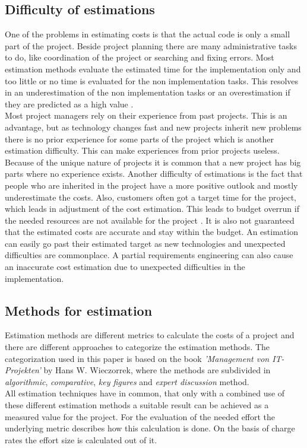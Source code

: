 \subsection{Difficulty of estimations}

One of the problems in estimating costs is that the actual code is only a small part of the project. Beside project planning there are many administrative tasks to do, like coordination of the project or searching and fixing errors. Most estimation methods evaluate the estimated time for the implementation only and too little or no time is evaluated for the non implementation tasks. This resolves in an underestimation of the non implementation tasks or an overestimation if they are predicted as a high value \cite{itplanung}.
\\
Most project managers rely on their experience from past projects. This is an advantage, but as technology changes fast and new projects inherit new problems there is no prior experience for some parts of the project which is another estimation difficulty. This can make experiences from prior projects useless. Because of the unique nature of projects it is common that a new project has big parts where no experience exists. Another difficulty of estimations is the fact that people who are inherited in the project have a more positive outlook and mostly underestimate the costs.
Also, customers often got a target time for the project, which leads in adjustment of the cost estimation. This leads to budget overrun if the needed resources are not available for the project \cite{winfwiki}. It is also not guaranteed that the estimated costs are accurate and stay within the budget. An estimation can easily go past their estimated target as new technologies and unexpected difficulties are commonplace. A partial requirements engineering can also cause an inaccurate cost estimation due to unexpected difficulties in the implementation.\\

\subsection{Methods for estimation}\label{chapter:estimationmethods}

Estimation methods are different metrics to calculate the costs of a project and there are different approaches to categorize the estimation methods. The categorization used in this paper is based on the book \textit{'Management von IT-Projekten'} by Hans W. Wieczorrek, where the methods are subdivided in \textit{algorithmic}, \textit{comparative}, \textit{key figures} and \textit{expert discussion} method\cite{itplanung}.\\
All estimation techniques have in common, that only with a combined use of these different estimation methods a suitable result can be achieved as a measured value for the project. For the evaluation of the needed effort the underlying metric describes how this calculation is done. On the basis of charge rates the effort size is calculated out of it.\\

